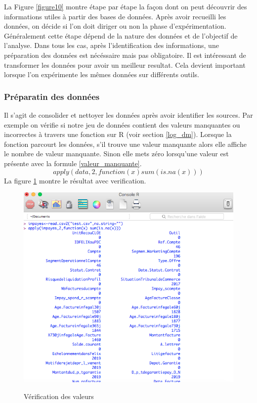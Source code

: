 \documentclass[11pt,a4paper]{report}
\begin{document}
La Figure \ref{figure10} montre étape par étape la façon dont on peut découvrir des informations utiles à partir des bases de données. 
Après avoir recueilli les données, on décide si l'on doit diriger ou non la phase d'expérimentation. Généralement cette étape dépend de la nature des données et de l'objectif de l'analyse. 
Dans tous les cas, après l'identification des informations, une préparation des données est nécéssaire mais pas obligatoire. Il est intéressant de transformer les données pour avoir un meilleur resultat. Cela devient important lorsque l'on expérimente les mêmes données sur différents outils.
\subsubsection{Préparatin des données}
Il s'agit de consolider et nettoyer les données après avoir identifier les sources. Par exemple on vérifie si notre jeu de données contient des valeurs manquantes ou incorrectes à travers une fonction sur R (voir section \ref{log_dm}).  
Lorsque la fonction parcourt les données, s'il trouve une valeur manquante alors elle affiche le nombre de valeur manquante. Sinon elle mets zéro lorsqu'une valeur est présente avec la formule  \ref{valeur_manquante}.  
\begin{equation}
apply(data,2,function(x) sum(is.na(x)))
\label{valeur_manquante}
\end{equation}
La figure \ref{figure11} montre le résultat avec verification. 
\begin{figure}[h]
\centering
\includegraphics[scale=0.35]{manquantes.png}\\
\label{figure11}
\caption{Vérification des valeurs}
\end{figure}
\end{document}
